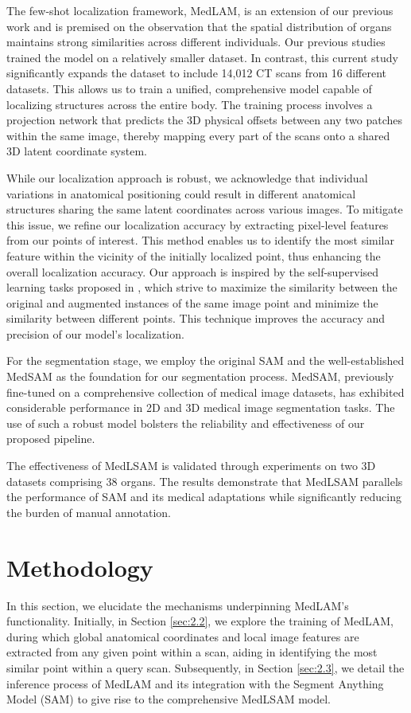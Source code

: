 \documentclass[a4paper]{llncs}
\begin{document}
The few-shot localization framework, MedLAM, is an extension of our previous work \cite{lei2021contrastive} and is premised on the observation that the spatial distribution of organs maintains strong similarities across different individuals. Our previous studies trained the model on a relatively smaller dataset. In contrast, this current study significantly expands the dataset to include 14,012 CT scans from 16 different datasets. This allows us to train a unified, comprehensive model capable of localizing structures across the entire body. The training process involves a projection network that predicts the 3D physical offsets between any two patches within the same image, thereby mapping every part of the scans onto a shared 3D latent coordinate system.

While our localization approach is robust, we acknowledge that individual variations in anatomical positioning could result in different anatomical structures sharing the same latent coordinates across various images. To mitigate this issue, we refine our localization accuracy by extracting pixel-level features from our points of interest. This method enables us to identify the most similar feature within the vicinity of the initially localized point, thus enhancing the overall localization accuracy. Our approach is inspired by the self-supervised learning tasks proposed in \cite{yao2021one, yan2022sam}, which strive to maximize the similarity between the original and augmented instances of the same image point and minimize the similarity between different points. This technique improves the accuracy and precision of our model's localization.

For the segmentation stage, we employ the original SAM and the well-established MedSAM \cite{MedSAM} as the foundation for our segmentation process. MedSAM, previously fine-tuned on a comprehensive collection of medical image datasets, has exhibited considerable performance in 2D and 3D medical image segmentation tasks. The use of such a robust model bolsters the reliability and effectiveness of our proposed pipeline.

The effectiveness of MedLSAM is validated through experiments on two 3D datasets comprising 38 organs. The results demonstrate that MedLSAM parallels the performance of SAM and its medical adaptations while significantly reducing the burden of manual annotation.

\par 
\section{Methodology}
In this section, we elucidate the mechanisms underpinning MedLAM's functionality. Initially, in Section \ref{sec:2.2}, we explore the training of MedLAM, during which global anatomical coordinates and local image features are extracted from any given point within a scan, aiding in identifying the most similar point within a query scan. Subsequently, in Section \ref{sec:2.3}, we detail the inference process of MedLAM and its integration with the Segment Anything Model (SAM) to give rise to the comprehensive MedLSAM model.
\end{document}
